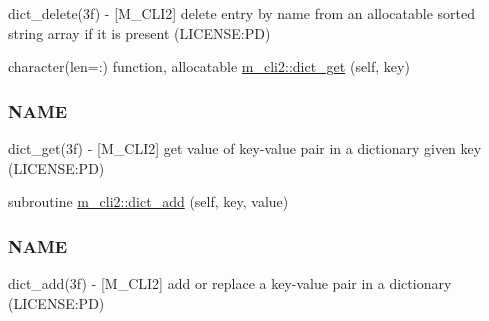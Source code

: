 \begin{DoxyCompactItemize}
\begin{DoxyCompactList}
dict\+\_\+delete(3f) -\/ \mbox{[}M\+\_\+\+C\+L\+I2\mbox{]} delete entry by name from an allocatable sorted string array if it is present (L\+I\+C\+E\+N\+SE\+:PD) \end{DoxyCompactList}\item 
character(len=\+:) function, allocatable \mbox{\hyperlink{namespacem__cli2_a5b489c992f1434fa27e7858a483a38c7}{m\+\_\+cli2\+::dict\+\_\+get}} (self, key)
\begin{DoxyCompactList}\small\item\em \subsubsection*{N\+A\+ME}

dict\+\_\+get(3f) -\/ \mbox{[}M\+\_\+\+C\+L\+I2\mbox{]} get value of key-\/value pair in a dictionary given key (L\+I\+C\+E\+N\+SE\+:PD) \end{DoxyCompactList}\item 
subroutine \mbox{\hyperlink{namespacem__cli2_a601a06b7038b524abababc8d437ee823}{m\+\_\+cli2\+::dict\+\_\+add}} (self, key, value)
\begin{DoxyCompactList}\small\item\em \subsubsection*{N\+A\+ME}

dict\+\_\+add(3f) -\/ \mbox{[}M\+\_\+\+C\+L\+I2\mbox{]} add or replace a key-\/value pair in a dictionary (L\+I\+C\+E\+N\+SE\+:PD) \end{DoxyCompactList}\end{DoxyCompactItemize}
